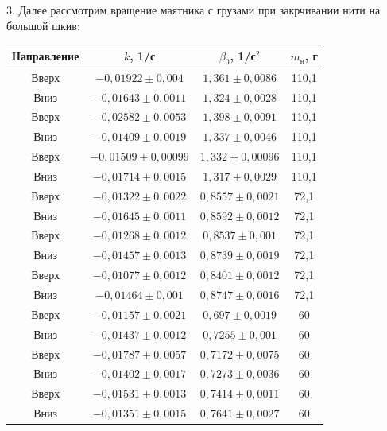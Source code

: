 3. Далее рассмотрим вращение маятника с грузами при закрчивании нити на большой шкив:
\begin{center}
\begin{tabular}{|c|c|c|c|}
    \hline
    Направление & $k$, 1/с & $\beta_0$, 1/с$^2$ & $m_\text{н}$, г \\
    \hline
    Вверх & $-0,01922 \pm 0,004$ & $1,361 \pm 0,0086$ & 110,1 \\
    \hline
    Вниз &$-0,01643 \pm 0,0011$ & $1,324 \pm 0,0028$ & 110,1 \\
    \hline
    Вверх &$-0,02582 \pm 0,0053$ & $1,398 \pm 0,0091$ & 110,1 \\
    \hline
    Вниз &$-0,01409 \pm 0,0019$ & $1,337 \pm 0,0046$ & 110,1 \\
    \hline
    Вверх &$-0,01509 \pm 0,00099$ & $1,332 \pm 0,00096$ & 110,1 \\
    \hline
    Вниз &$-0,01714 \pm 0,0015$ & $1,317 \pm 0,0029$ & 110,1 \\
    \hline
    Вверх &$-0,01322 \pm 0,0022$ & $0,8557 \pm 0,0021$ & 72,1 \\
    \hline
    Вниз &$-0,01645 \pm 0,0011$ & $0,8592 \pm 0,0012$ & 72,1 \\
    \hline
    Вверх &$-0,01268 \pm 0,0012$ & $0,8537 \pm 0,001$ & 72,1 \\
    \hline
    Вниз &$-0,01457 \pm 0,0013$ & $0,8739 \pm 0,0019$ & 72,1 \\
    \hline
    Вверх &$-0,01077 \pm 0,0012$ & $0,8401 \pm 0,0012$ & 72,1 \\
    \hline
    Вниз &$-0,01464 \pm 0,001$ & $0,8747 \pm 0,0016$ & 72,1 \\
    \hline
    Вверх &$-0,01157 \pm 0,0021$ & $0,697 \pm 0,0019$ & 60 \\
    \hline
    Вниз &$-0,01437 \pm 0,0012$ & $0,7255 \pm 0,001$ & 60 \\
    \hline
    Вверх &$-0,01787 \pm 0,0057$ & $0,7172 \pm 0,0075$ & 60 \\
    \hline
    Вниз &$-0,01402 \pm 0,0017$ & $0,7273 \pm 0,0036$ & 60 \\
    \hline
    Вверх &$-0,01531 \pm 0,0013$ & $0,7414 \pm 0,0011$ & 60 \\
    \hline
    Вниз &$-0,01351 \pm 0,0015$ & $0,7641 \pm 0,0027$ & 60 \\
    \hline
\end{tabular}
\end{center}

